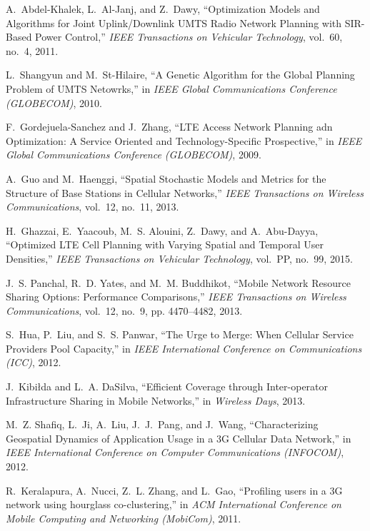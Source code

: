 \documentclass[10pt,journal,cspaper,compsoc]{IEEEtran}
\begin{document}
\begin{thebibliography}{10}
A.~Abdel-Khalek, L.~Al-Janj, and Z.~Dawy, ``{Optimization Models and Algorithms
  for Joint Uplink/Downlink UMTS Radio Network Planning with SIR-Based Power
  Control},'' \emph{IEEE Transactions on Vehicular Technology}, vol.~60, no.~4,
  2011.

L.~Shangyun and M.~St-Hilaire, ``{A Genetic Algorithm for the Global Planning
  Problem of UMTS Netowrks},'' in \emph{IEEE Global Communications Conference
  (GLOBECOM)}, 2010.

F.~Gordejuela-Sanchez and J.~Zhang, ``{LTE Access Network Planning adn
  Optimization: A Service Oriented and Technology-Specific Prospective},'' in
  \emph{IEEE Global Communications Conference (GLOBECOM)}, 2009.

A.~Guo and M.~Haenggi, ``{Spatial Stochastic Models and Metrics for the
  Structure of Base Stations in Cellular Networks},'' \emph{IEEE Transactions
  on Wireless Communications}, vol.~12, no.~11, 2013.

H.~Ghazzai, E.~Yaacoub, M.~S. Alouini, Z.~Dawy, and A.~Abu-Dayya, ``{Optimized
  LTE Cell Planning with Varying Spatial and Temporal User Densities},''
  \emph{IEEE Transactions on Vehicular Technology}, vol.~PP, no.~99, 2015.

J.~S. Panchal, R.~D. Yates, and M.~M. Buddhikot, ``{Mobile Network Resource
  Sharing Options: Performance Comparisons},'' \emph{IEEE Transactions on
  Wireless Communications}, vol.~12, no.~9, pp. 4470--4482, 2013.

S.~Hua, P.~Liu, and S.~S. Panwar, ``{The Urge to Merge: When Cellular Service
  Providers Pool Capacity},'' in \emph{IEEE International Conference on
  Communications (ICC)}, 2012.

J.~Kibi{\l}da and L.~A. DaSilva, ``{Efficient Coverage through Inter-operator
  Infrastructure Sharing in Mobile Networks},'' in \emph{Wireless Days}, 2013.

M.~Z. Shafiq, L.~Ji, A.~Liu, J.~J.~Pang, and J.~Wang, ``{Characterizing
  Geospatial Dynamics of Application Usage in a 3G Cellular Data Network},'' in
  \emph{IEEE International Conference on Computer Communications (INFOCOM)},
  2012.

R.~Keralapura, A.~Nucci, Z.~L. Zhang, and L.~Gao, ``{Profiling users in a 3G
  network using hourglass co-clustering},'' in \emph{ACM International
  Conference on Mobile Computing and Networking (MobiCom)}, 2011.


\end{thebibliography}
\end{document}

